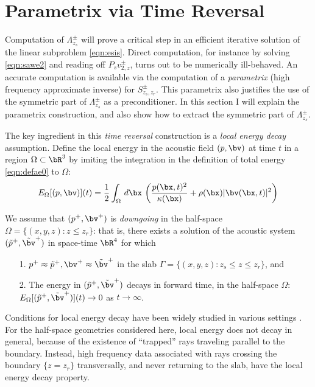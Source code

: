 \section{Parametrix via Time Reversal}

Computation of $\Lambda^{\pm}_{z_s}$ will prove a critical step in an
efficient iterative solution of the linear subproblem
\ref{eqn:esis}. Direct computation, for instance by solving
\ref{eqn:sawe2} and reading off $P_sv^{\pm}_{2,z}$, turns out to be
numerically ill-behaved. An accurate computation is available via the
computation of a {\em parametrix} (high frequency approximate inverse)
for $S^{\pm}_{z_s,z_r}$. This parametrix also justifies the use of the
symmetric part of $\Lambda^{\pm}_{z_s}$ as a preconditioner. In this
section I will explain the parametrix construction, and also show how
to extract the symmetric part of $\Lambda^{\pm}_{z_s}$.

The key ingredient in this {\em time reversal} construction is a
{\em local energy decay} assumption. Define the local energy in the
acoustic field $(p,\bv)$ at
time $t$ in a region $\Omega \subset \bR^3$ by imiting the integration
in the definition of total energy \ref{eqn:defae0} to $\Omega$:
\begin{equation}
  \label{eqn:defaeloc}
  E_{\Omega}[(p,\bv)](t) = \frac{1}{2} \int_{\Omega} \,d\bx \, \left(\frac{p(\bx,t)^2}{\kappa(\bx)} + \rho(\bx) |\bv(\bx,t)|^2\right)
\end{equation}

We assume that $(p^+,\bv^+)$ is {\em downgoing} in the half-space
$\Omega = \{(x,y,z): z \le z_r\}$: that is, there exists a solution of
the acoustic system $(\tilde{p}^+,\tilde{\bv}^+)$ in space-time $\bR^4$
for which
\begin{itemize}
\item[1. ] $p^+ \approx \tilde{p}^+, \bv^+ \approx \tilde{\bv}^+$ in
  the slab $\Gamma = \{(x,y,z): z_s \le z \le z_r\}$, and
\item[2. ] The energy in $(\tilde{p}^+,\tilde{\bv}^+)$ decays in
  forward time, in the half-space $\Omega$:  $E_{\Omega}[(\tilde{p}^+,\tilde{\bv}^+)](t) \rightarrow 0$
  as $t \rightarrow \infty$.
\end{itemize}

Conditions for local energy decay have been widely studied in various
settings \cite[]{MorawetzPhillipsLax:05,Hristova:09}. For the half-space
geometries considered here, local energy does not decay in general,
because of the existence of ``trapped'' rays traveling parallel to the
boundary. Instead, high frequency data associated with rays crossing
the boundary $\{z=z_r\}$ transversally, and never returning to the slab, have
the local energy decay property.

